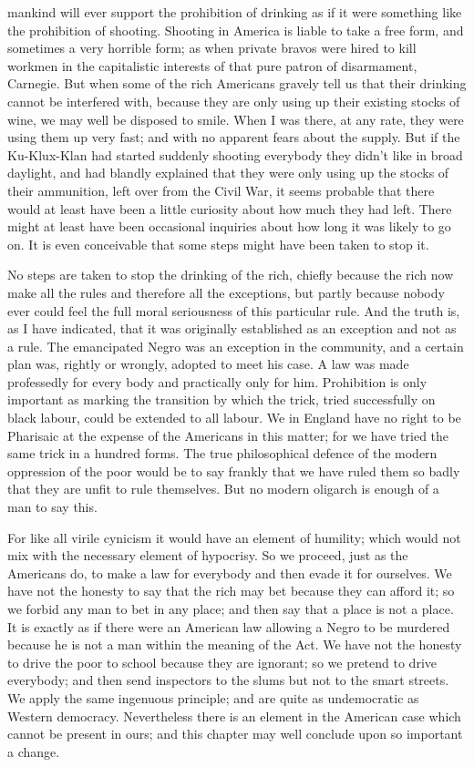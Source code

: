 \documentclass{book}
\begin{document}
mankind will ever support the prohibition of drinking as if it were something like the prohibition of shooting. Shooting in America is liable to take a free form, and sometimes a very horrible form; as when private bravos were hired to kill workmen in the capitalistic interests of that pure patron of disarmament, Carnegie. But when some of the rich Americans gravely tell us that their drinking cannot be interfered with, because they are only using up their existing stocks of wine, we may well be disposed to smile. When I was there, at any rate, they were using them up very fast; and with no apparent fears about the supply. But if the Ku-Klux-Klan had started suddenly shooting everybody they didn’t like in broad daylight, and had blandly explained that they were only using up the stocks of their ammunition, left over from the Civil War, it seems probable that there would at least have been a little curiosity about how much they had left. There might at least have been occasional inquiries about how long it was likely to go on. It is even conceivable that some steps might have been taken to stop it.

No steps are taken to stop the drinking of the rich, chiefly because the rich now make all the rules and therefore all the exceptions, but partly because nobody ever could feel the full moral seriousness of this particular rule. And the truth is, as I have indicated, that it was originally established as an exception and not as a rule. The emancipated Negro was an exception in the community, and a certain plan was, rightly or wrongly, adopted to meet his case. A law was made professedly for every body and practically only for him. Prohibition is only important as marking the transition by which the trick, tried successfully on black labour, could be extended to all labour. We in England have no right to be Pharisaic at the expense of the Americans in this matter; for we have tried the same trick in a hundred forms. The true philosophical defence of the modern oppression of the poor would be to say frankly that we have ruled them so badly that they are unfit to rule themselves. But no modern oligarch is enough of a man to say this.

For like all virile cynicism it would have an element of humility; which would not mix with the necessary element of hypocrisy. So we proceed, just as the Americans do, to make a law for everybody and then evade it for ourselves. We have not the honesty to say that the rich may bet because they can afford it; so we forbid any man to bet in any place; and then say that a place is not a place. It is exactly as if there were an American law allowing a Negro to be murdered because he is not a man within the meaning of the Act. We have not the honesty to drive the poor to school because they are ignorant; so we pretend to drive everybody; and then send inspectors to the slums but not to the smart streets. We apply the same ingenuous principle; and are quite as undemocratic as Western democracy. Nevertheless there is an element in the American case which cannot be present in ours; and this chapter may well conclude upon so important a change.
\end{document}
